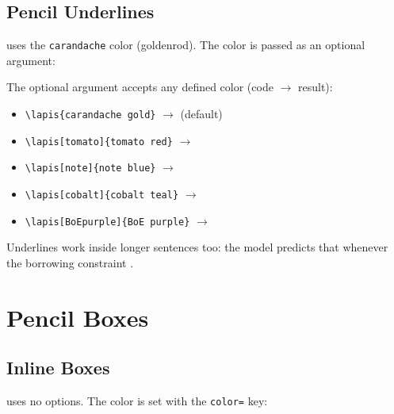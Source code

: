 \documentclass[11pt,a4paper]{article}
\begin{document}
\subsection{Pencil Underlines}

 uses the \texttt{carandache} color (goldenrod). The color is passed as an optional argument:

\begin{democode}
\end{democode}

\noindent The optional argument accepts any defined color (code $\to$ result):

\begin{itemize}
    \item \verb|\lapis{carandache gold}| $\to$  (default)
    \item \verb|\lapis[tomato]{tomato red}| $\to$ 
    \item \verb|\lapis[note]{note blue}| $\to$ 
    \item \verb|\lapis[cobalt]{cobalt teal}| $\to$ 
    \item \verb|\lapis[BoEpurple]{BoE purple}| $\to$ 
\end{itemize}

Underlines work inside longer sentences too: the model predicts that  whenever the borrowing constraint .

\section{Pencil Boxes}

\subsection{Inline Boxes}

 uses no options. The color is set with the \texttt{color=} key:

\begin{democode}
\end{democode}
\end{document}

